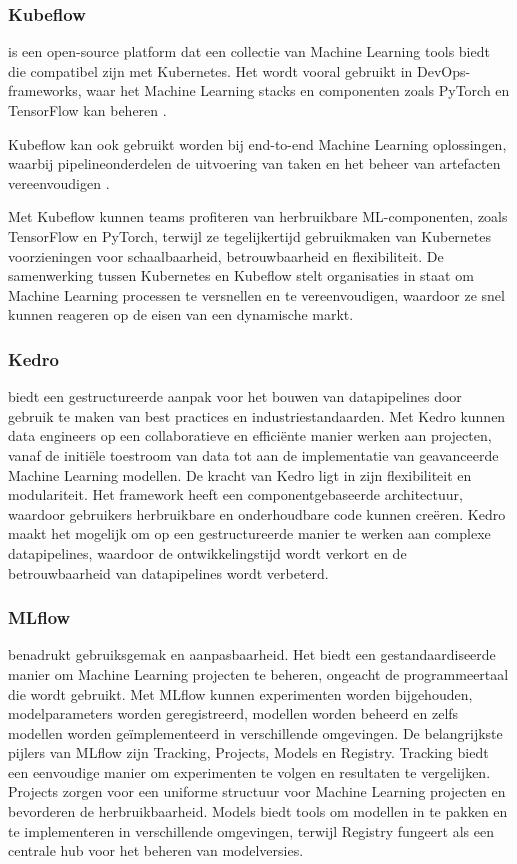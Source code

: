 \subsubsection{Kubeflow}
\textcite{Kubeflow2021} is een open-source platform dat een collectie van Machine Learning tools biedt die compatibel zijn met Kubernetes. Het wordt vooral gebruikt in DevOps-frameworks, waar het Machine Learning stacks en componenten zoals PyTorch en TensorFlow kan beheren \autocite{Chandana2021}.

Kubeflow kan ook gebruikt worden bij end-to-end Machine Learning oplossingen, waarbij pipelineonderdelen de uitvoering van taken en het beheer van artefacten vereenvoudigen \autocite{Bisong2019}.

Met Kubeflow kunnen teams profiteren van herbruikbare ML-componenten, zoals TensorFlow en PyTorch, terwijl ze tegelijkertijd gebruikmaken van Kubernetes voorzieningen voor schaalbaarheid, betrouwbaarheid en flexibiliteit. De samenwerking tussen Kubernetes en Kubeflow stelt organisaties in staat om Machine Learning processen te versnellen en te vereenvoudigen, waardoor ze snel kunnen reageren op de eisen van een dynamische markt.

\subsubsection{Kedro}
\textcite{Kedro2024} biedt een gestructureerde aanpak voor het bouwen van datapipelines door gebruik te maken van best practices en industriestandaarden. Met Kedro kunnen data engineers op een collaboratieve en efficiënte manier werken aan projecten, vanaf de initiële toestroom van data tot aan de implementatie van geavanceerde Machine Learning modellen.
De kracht van Kedro ligt in zijn flexibiliteit en modulariteit. Het framework heeft een componentgebaseerde architectuur, waardoor gebruikers herbruikbare en onderhoudbare code kunnen creëren. Kedro maakt het mogelijk om op een gestructureerde manier te werken aan complexe datapipelines, waardoor de ontwikkelingstijd wordt verkort en de betrouwbaarheid van datapipelines wordt verbeterd.
\subsubsection{MLflow}
\textcite{MLflow2023} benadrukt gebruiksgemak en aanpasbaarheid. Het biedt een gestandaardiseerde manier om Machine Learning projecten te beheren, ongeacht de programmeertaal die wordt gebruikt. Met MLflow kunnen experimenten worden bijgehouden, modelparameters worden geregistreerd, modellen worden beheerd en zelfs modellen worden geïmplementeerd in verschillende omgevingen.
De belangrijkste pijlers van MLflow zijn Tracking, Projects, Models en Registry. Tracking biedt een eenvoudige manier om experimenten te volgen en resultaten te vergelijken. Projects zorgen voor een uniforme structuur voor Machine Learning projecten en bevorderen de herbruikbaarheid. Models biedt tools om modellen in te pakken en te implementeren in verschillende omgevingen, terwijl Registry fungeert als een centrale hub voor het beheren van modelversies.

